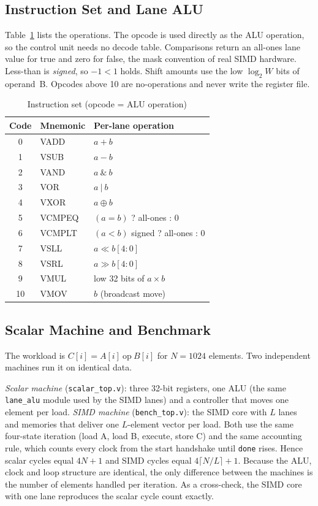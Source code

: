 \documentclass[conference]{IEEEtran}
\begin{document}
\subsection{Instruction Set and Lane ALU}
Table~\ref{tab:isa} lists the operations. The opcode is used directly as the ALU operation, so the control unit needs no decode table. Comparisons return an all-ones lane value for true and zero for false, the mask convention of real SIMD hardware. Less-than is \emph{signed}, so $-1<1$ holds. Shift amounts use the low $\log_2 W$ bits of operand~B. Opcodes above 10 are no-operations and never write the register file.

\begin{table}[t]\centering\caption{Instruction set (opcode = ALU operation)}\label{tab:isa}
\begin{tabular}{@{}cll@{}}\toprule
Code & Mnemonic & Per-lane operation\\\midrule
0 & VADD & $a+b$\\ 1 & VSUB & $a-b$\\ 2 & VAND & $a\ \&\ b$\\ 3 & VOR & $a\ |\ b$\\ 4 & VXOR & $a\oplus b$\\
5 & VCMPEQ & $(a=b)$ ? all-ones : 0\\ 6 & VCMPLT & $(a<b)$ signed ? all-ones : 0\\
7 & VSLL & $a\ll b[4:0]$\\ 8 & VSRL & $a\gg b[4:0]$\\ 9 & VMUL & low 32 bits of $a\times b$\\ 10 & VMOV & $b$ (broadcast move)\\\bottomrule
\end{tabular}\end{table}

\subsection{Scalar Machine and Benchmark}
The workload is $C[i]=A[i]\ \mathrm{op}\ B[i]$ for $N=1024$ elements. Two independent machines run it on identical data.

\emph{Scalar machine} (\texttt{scalar\_top.v}): three 32-bit registers, one ALU (the same \texttt{lane\_alu} module used by the SIMD lanes) and a controller that moves one element per load. \emph{SIMD machine} (\texttt{bench\_top.v}): the SIMD core with $L$ lanes and memories that deliver one $L$-element vector per load. Both use the same four-state iteration (load A, load B, execute, store C) and the same accounting rule, which counts every clock from the start handshake until \texttt{done} rises. Hence scalar cycles equal $4N+1$ and SIMD cycles equal $4\lceil N/L\rceil+1$. Because the ALU, clock and loop structure are identical, the only difference between the machines is the number of elements handled per iteration. As a cross-check, the SIMD core with one lane reproduces the scalar cycle count exactly.
\end{document}
